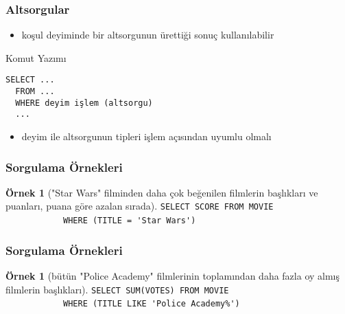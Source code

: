 \documentclass[dvipsnames]{beamer}
\theoremstyle{definition}
\theoremstyle{example}
\newtheorem{ornek}[theorem]{Örnek}
\theoremstyle{plain}
\begin{document}
\begin{frame}[fragile]
  \frametitle{Altsorgular}

  \begin{itemize}
    \item koşul deyiminde bir altsorgunun ürettiği sonuç kullanılabilir
  \end{itemize}

  \begin{block}{Komut Yazımı}
    \begin{lstlisting}
SELECT ...
  FROM ...
  WHERE deyim işlem (altsorgu)
  ...
    \end{lstlisting}
  \end{block}

  \pause
  \begin{itemize}
    \item deyim ile altsorgunun tipleri işlem açısından uyumlu olmalı
  \end{itemize}
\end{frame}

\begin{frame}[fragile]
  \frametitle{Sorgulama Örnekleri}

  \begin{ornek}["Star Wars" filminden daha çok beğenilen filmlerin başlıkları ve
                puanları, puana göre azalan sırada]
\lstinline!SELECT SCORE FROM MOVIE!\\
~~~~~~~~~~~~\lstinline!WHERE (TITLE = 'Star Wars')!
  \end{ornek}
\end{frame}

\begin{frame}[fragile]
  \frametitle{Sorgulama Örnekleri}

  \begin{ornek}[bütün "Police Academy" filmlerinin toplamından daha fazla oy
                almış filmlerin başlıkları]
\lstinline!SELECT SUM(VOTES) FROM MOVIE!\\
~~~~~~~~~~~~\lstinline!WHERE (TITLE LIKE 'Police Academy%')!
  \end{ornek}
\end{frame}
\end{document}
